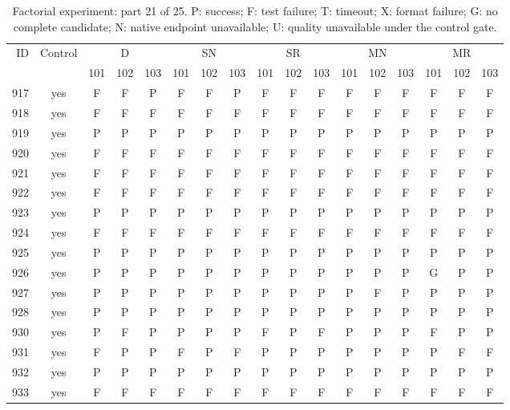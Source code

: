 \begin{table}[p]\centering\footnotesize
\setlength{\tabcolsep}{3pt}
\caption{Factorial experiment: part 21 of 25. P: success; F: test failure; T: timeout; X: format failure; G: no complete candidate; N: native endpoint unavailable; U: quality unavailable under the control gate.}
\begin{tabular*}{\textwidth}{@{\extracolsep{\fill}}rcccccccccccccccc}\toprule
ID & Control & \multicolumn{3}{c}{D} & \multicolumn{3}{c}{SN} & \multicolumn{3}{c}{SR} & \multicolumn{3}{c}{MN} & \multicolumn{3}{c}{MR}\\
\cmidrule(lr){3-5}\cmidrule(lr){6-8}\cmidrule(lr){9-11}\cmidrule(lr){12-14}\cmidrule(lr){15-17}
 & & 101 & 102 & 103 & 101 & 102 & 103 & 101 & 102 & 103 & 101 & 102 & 103 & 101 & 102 & 103\\\midrule
917 & yes & F & F & P & F & F & P & F & F & F & F & F & F & F & F & F\\
918 & yes & F & F & F & F & F & F & F & F & F & F & F & F & F & F & F\\
919 & yes & P & P & P & P & P & P & P & P & P & P & P & P & P & P & P\\
920 & yes & F & F & F & F & F & F & F & F & F & F & F & F & F & F & F\\
921 & yes & F & F & F & F & F & F & F & F & F & F & F & F & F & F & F\\
922 & yes & F & F & F & F & F & F & F & F & F & F & F & F & F & F & F\\
923 & yes & P & P & P & P & P & P & P & P & P & P & P & P & P & P & P\\
924 & yes & F & F & F & F & F & F & F & F & F & F & F & F & F & F & F\\
925 & yes & P & P & P & P & P & P & P & P & P & P & P & P & P & P & P\\
926 & yes & P & P & P & P & P & P & P & P & P & P & P & P & G & P & P\\
927 & yes & P & P & P & P & P & P & P & P & P & P & F & P & P & P & P\\
928 & yes & P & P & P & P & P & P & P & P & P & P & P & P & P & P & P\\
930 & yes & P & F & P & P & P & P & F & P & F & P & P & P & F & P & P\\
931 & yes & F & P & P & F & P & F & P & P & P & P & P & P & P & F & F\\
932 & yes & P & P & P & P & P & P & P & P & P & P & P & P & P & P & P\\
933 & yes & F & F & F & F & F & F & F & F & F & F & F & F & F & F & F\\

\end{tabular*}
\end{table}
